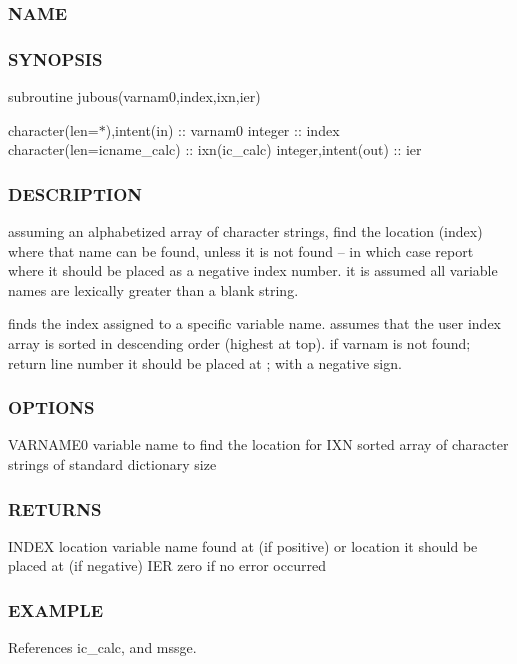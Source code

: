 \subsubsection*{N\+A\+ME}

\subsubsection*{S\+Y\+N\+O\+P\+S\+IS}

subroutine jubous(varnam0,index,ixn,ier)

character(len=$\ast$),intent(in) \+:\+: varnam0 integer \+:\+: index character(len=icname\+\_\+calc) \+:\+: ixn(ic\+\_\+calc) integer,intent(out) \+:\+: ier \subsubsection*{D\+E\+S\+C\+R\+I\+P\+T\+I\+ON}

assuming an alphabetized array of character strings, find the location (index) where that name can be found, unless it is not found -- in which case report where it should be placed as a negative index number. it is assumed all variable names are lexically greater than a blank string.

finds the index assigned to a specific variable name. assumes that the user index array is sorted in descending order (highest at top). if varnam is not found; return line number it should be placed at ; with a negative sign. \subsubsection*{O\+P\+T\+I\+O\+NS}

V\+A\+R\+N\+A\+M\+E0 variable name to find the location for I\+XN sorted array of character strings of standard dictionary size \subsubsection*{R\+E\+T\+U\+R\+NS}

I\+N\+D\+EX location variable name found at (if positive) or location it should be placed at (if negative) I\+ER zero if no error occurred \subsubsection*{E\+X\+A\+M\+P\+LE}

References ic\+\_\+calc, and mssge.

